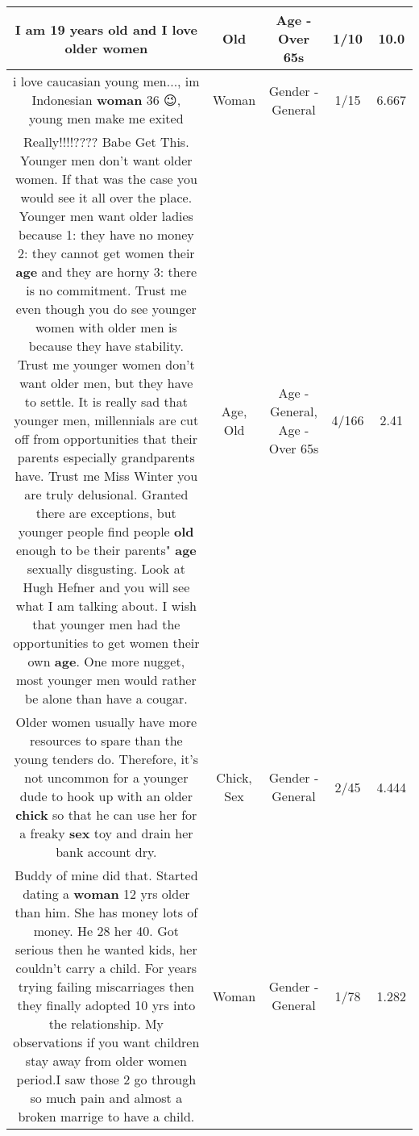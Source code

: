 \documentclass[11pt]{article}
\newlength\mylength
\begin{document}
\begin{center}
\begin{longtable}{|C{.65\mylength}|C{.30\mylength}|C{.12\mylength}|C{.12\mylength}|C{.12\mylength}|}
  \small I am 19 years \textbf{old} and I love older women\normalsize   & Old & Age - Over 65s & 1/10 & 10.0 \\  \hline
  \small i love caucasian young men..., im Indonesian \textbf{woman} 36 😉, young men make me exited\normalsize   & Woman & Gender - General & 1/15 & 6.667 \\  \hline
  \small Really!!!!???? Babe Get This.  Younger men don't want older women.  If that was the case you would see it all over the place.  Younger men want older ladies because 1: they have no money 2: they cannot get women their \textbf{age} and they are horny 3: there is no commitment.  Trust me even though you do see younger women with older men is because they have stability. Trust me younger women don't want older men, but they have to settle.  It is really sad that younger men, millennials are cut off from opportunities that their parents especially grandparents have.  Trust me Miss Winter you are truly delusional.  Granted there are exceptions, but younger people find people \textbf{old} enough to be their parents" \textbf{age} sexually disgusting. Look at Hugh Hefner and you will see what I am talking about.  I wish that younger men had the opportunities to get women their own \textbf{age}.  One more nugget, most younger men would rather be alone than have a cougar.\normalsize   & Age, Old & Age - General, Age - Over 65s & 4/166 & 2.41 \\  \hline
  \small Older women usually have more resources to spare than the young tenders do. Therefore, it's not uncommon for a younger dude to hook up with an older \textbf{chick} so that he can use her for a freaky \textbf{sex} toy and drain her bank account dry.\normalsize   & Chick, Sex & Gender - General & 2/45 & 4.444 \\  \hline
  \small Buddy of mine did that. Started dating a \textbf{woman} 12 yrs older than him. She has money lots of money. He 28 her 40. Got serious then he wanted kids, her couldn't carry a child. For years trying failing miscarriages then they finally adopted 10 yrs into the relationship. My observations if you want children stay away from older women period.I saw those 2 go through so much pain and almost a broken marrige to have a child.\normalsize   & Woman & Gender - General & 1/78 & 1.282 \\  \hline

\end{longtable}
\end{center}
\end{document}
